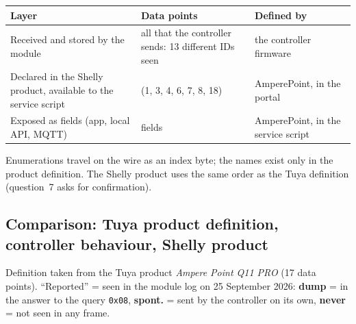 \documentclass[11pt,a4paper]{article}
\newcommand{\hx}[1]{\texttt{#1}}
\begin{document}
\begin{longtable}{>{\raggedright\arraybackslash}p{6.2cm}>{\raggedright\arraybackslash}p{3.0cm}>{\raggedright\arraybackslash}p{6.9cm}}
\toprule
\rowcolor{aphead}\textbf{Layer} & \textbf{Data points} & \textbf{Defined by} \\
\midrule\endhead
\bottomrule\endfoot
Received and stored by the module & all that the controller sends: 13 different IDs seen & the controller firmware \\
Declared in the Shelly product, available to the service script & 7 (1, 3, 4, 6, 7, 8, 18) & AmperePoint, in the portal \\
Exposed as fields (app, local API, MQTT) & 6 fields & AmperePoint, in the service script \\
\end{longtable}

Enumerations travel on the wire as an index byte; the names exist only in the product definition. The Shelly product uses the same order as the Tuya definition (question~7 asks for confirmation).

\subsection{Comparison: Tuya product definition, controller behaviour, Shelly product}

Definition taken from the Tuya product \emph{Ampere Point Q11 PRO} (17 data points). ``Reported'' = seen in the module log on 25 September 2026: \textbf{dump} = in the answer to the query \hx{0x08}, \textbf{spont.} = sent by the controller on its own, \textbf{never} = not seen in any frame.
\end{document}
